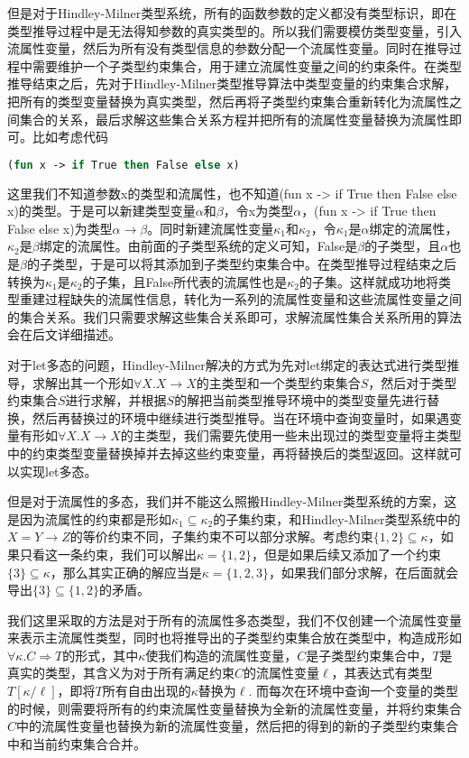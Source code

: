 \documentclass[UTF8, colorlinks]{pkuthss}
\begin{document}
	但是对于Hindley-Milner类型系统，所有的函数参数的定义都没有类型标识，即在类型推导过程中是无法得知参数的真实类型的。所以我们需要模仿类型变量，引入流属性变量，然后为所有没有类型信息的参数分配一个流属性变量。同时在推导过程中需要维护一个子类型约束集合，用于建立流属性变量之间的约束条件。在类型推导结束之后，先对于Hindley-Milner类型推导算法中类型变量的约束集合求解，把所有的类型变量替换为真实类型，然后再将子类型约束集合重新转化为流属性之间集合的关系，最后求解这些集合关系方程并把所有的流属性变量替换为流属性即可。比如考虑代码
	\begin{lstlisting}[language=Ocaml]
		(fun x -> if True then False else x)
	\end{lstlisting}
	这里我们不知道参数x的类型和流属性，也不知道(fun x -> if True then False else x)的类型。于是可以新建类型变量$\alpha$和$\beta$，令x为类型$\alpha$，(fun x -> if True then False else x)为类型$\alpha\to\beta$。同时新建流属性变量$\kappa_1$和$\kappa_2$，令$\kappa_1$是$\alpha$绑定的流属性，$\kappa_2$是$\beta$绑定的流属性。由前面的子类型系统的定义可知，False是$\beta$的子类型，且$\alpha$也是$\beta$的子类型，于是可以将其添加到子类型约束集合中。在类型推导过程结束之后转换为$\kappa_1$是$\kappa_2$的子集，且False所代表的流属性也是$\kappa_2$的子集。这样就成功地将类型重建过程缺失的流属性信息，转化为一系列的流属性变量和这些流属性变量之间的集合关系。我们只需要求解这些集合关系即可，求解流属性集合关系所用的算法会在后文详细描述。
	
	对于let多态的问题，Hindley-Milner解决的方式为先对let绑定的表达式进行类型推导，求解出其一个形如$\forall X.X\to X$的主类型和一个类型约束集合$S$，然后对于类型约束集合$S$进行求解，并根据$S$的解把当前类型推导环境中的类型变量先进行替换，然后再替换过的环境中继续进行类型推导。当在环境中查询变量时，如果遇变量有形如$\forall X.X\to X$的主类型，我们需要先使用一些未出现过的类型变量将主类型中的约束类型变量替换掉并去掉这些约束变量，再将替换后的类型返回。这样就可以实现let多态。
	
	但是对于流属性的多态，我们并不能这么照搬Hindley-Milner类型系统的方案，这是因为流属性的约束都是形如$\kappa_1\subseteq \kappa_2$的子集约束，和Hindley-Milner类型系统中的$X = Y\to Z$的等价约束不同，子集约束不可以部分求解。考虑约束$\{1, 2\}\subseteq \kappa$，如果只看这一条约束，我们可以解出$\kappa = \{1, 2\}$，但是如果后续又添加了一个约束$\{3\} \subseteq \kappa$，那么其实正确的解应当是$\kappa = \{1, 2, 3\}$，如果我们部分求解，在后面就会导出$\{3\} \subseteq \{1, 2\}$的矛盾。
	
	我们这里采取的方法是对于所有的流属性多态类型，我们不仅创建一个流属性变量来表示主流属性类型，同时也将推导出的子类型约束集合放在类型中，构造成形如$\forall\kappa. C\Rightarrow T$的形式，其中$\kappa$使我们构造的流属性变量，$C$是子类型约束集合中，$T$是真实的类型，其含义为对于所有满足约束$C$的流属性变量$\ell$，其表达式有类型$T[\kappa/\ell]$，即将$T$所有自由出现的$\kappa$替换为$\ell$. 而每次在环境中查询一个变量的类型的时候，则需要将所有的约束流属性变量替换为全新的流属性变量，并将约束集合$C$中的流属性变量也替换为新的流属性变量，然后把的得到的新的子类型约束集合中和当前约束集合合并。
	
\end{document}
